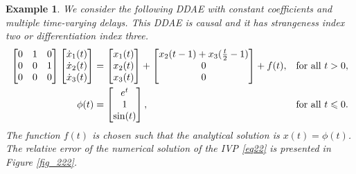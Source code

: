 \documentclass[final,reqno]{siamltex}
\newtheorem{example}[theorem]{Example}
\begin{document}
\begin{example} 
We consider the following DDAE with constant coefficients and multiple time-varying delays. This DDAE is causal and it has 
strangeness index two or differentiation index three.
%
\begin{equation}\label{eq22}
\begin{aligned}
\m{
0&1&0\\
0&0&1 \\
0&0&0 
}
\m{\dot{x}_1(t) \\ \dot{x}_2(t) \\ \dot{x}_3(t)} &=
\m{x_1(t) \\ x_2(t) \\ x_3(t)} + 
\m{
x_2(t-1)+x_3(\tfrac t2-1)\\
0\\
0
}
+f(t), && \mbox{for all } t>0,\\
\phi(t) &=
\m{
e^t\\
1\\
\sin(t)
},
&& \mbox{for all } t \leq 0.
\end{aligned}
\end{equation}
The function $f(t)$ is chosen such that the analytical solution is $x(t)=\phi(t)$. The relative error of the numerical solution of the IVP \eqref{eq22} is presented in Figure \ref{fig_222}.
\end{example}
\end{document}
